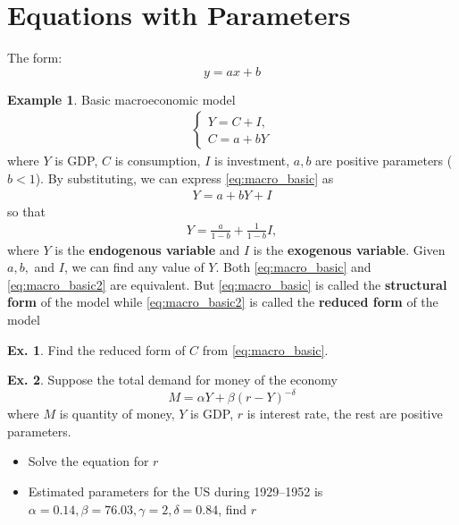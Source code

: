 \documentclass[10pt,a4paper]{book}
\theoremstyle{definition}\newtheorem{definition}{Definition}
\theoremstyle{definition}\newtheorem{fact}{Fact}
\theoremstyle{definition}\newtheorem{ex}{Ex.}
\theoremstyle{definition}\newtheorem{project}{Project}
\theoremstyle{definition}\newtheorem{problem}{Problem}
\theoremstyle{definition}\newtheorem{example}{Example}
\numberwithin{theorem}{chapter}
\numberwithin{corollary}{chapter}
\numberwithin{assumption}{chapter}
\numberwithin{definition}{chapter}
\numberwithin{prop}{chapter}
\numberwithin{notation}{chapter}
\numberwithin{problem}{chapter}
\numberwithin{example}{chapter}
\numberwithin{fact}{chapter}
\numberwithin{ex}{chapter}
\begin{document}
	\section{Equations with Parameters}
	The form:
	\begin{equation*}
		y = ax + b
	\end{equation*}
	
	\begin{example}
		Basic macroeconomic model
		\begin{align}
			\begin{cases}                     
				Y = C + I,                        \\
				C = a + bY \label{eq:macro_basic} 
			\end{cases}                       
		\end{align}
		where $Y$ is GDP, $C$ is consumption, $I$ is investment, $a, b$ are positive parameters ($b<1$). By substituting, we can express \eqref{eq:macro_basic} as
		\begin{align*}
			Y = a + bY + I 
		\end{align*}
		so that
		\begin{align}
			Y = \frac{a}{1-b} + \frac{1}{1-b} I \label{eq:macro_basic2}, 
		\end{align}
		where $Y$ is the \textbf{endogenous variable} and $I$ is the \textbf{exogenous variable}. Given $a,b,$ and $I$, we can find any value of $Y$. Both \eqref{eq:macro_basic} and \eqref{eq:macro_basic2} are equivalent. But \eqref{eq:macro_basic} is called the \textbf{structural form} of the model while \eqref{eq:macro_basic2}  is called the \textbf{reduced form} of the model
	\end{example}
	
	\begin{ex}
		Find the reduced form of $C$ from \eqref{eq:macro_basic}.
	\end{ex}
	
	\begin{ex}
		Suppose the total demand for money of the economy
		\begin{equation*}
			M = \alpha Y + \beta (r-Y)^{-\delta}
		\end{equation*}
		where $M$ is quantity of money, $Y$ is GDP, $r$ is interest rate, the rest are positive parameters.
		\begin{itemize}
			\item Solve the equation for $r$ \\
			\item Estimated parameters for the US during 1929--1952 is $\alpha=0.14, \beta=76.03,\gamma=2,\delta=0.84$, find $r$
		\end{itemize}
	\end{ex}
	
\end{document}
